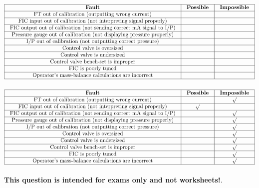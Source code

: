 $$\vbox{\offinterlineskip
\halign{\strut
\vrule \quad\hfil # \ \hfil & 
\vrule \quad\hfil # \ \hfil & 
\vrule \quad\hfil # \ \hfil \vrule \cr
\noalign{\hrule}
%
{\bf Fault} & {\bf Possible} & {\bf Impossible} \cr
%
\noalign{\hrule}
%
FT out of calibration (outputting wrong current) &  &  \cr
%
\noalign{\hrule}
%
FIC input out of calibration (not interpreting signal properly) &  &  \cr
%
\noalign{\hrule}
%
FIC output out of calibration (not sending correct mA signal to I/P) &  &  \cr
%
\noalign{\hrule}
%
Pressure gauge out of calibration (not displaying pressure properly) &  &  \cr
%
\noalign{\hrule}
%
I/P out of calibration (not outputting correct pressure) &  &  \cr
%
\noalign{\hrule}
%
Control valve is oversized &  &  \cr
%
\noalign{\hrule}
%
Control valve is undersized &  &  \cr
%
\noalign{\hrule}
%
Control valve bench-set is improper &  &  \cr
%
\noalign{\hrule}
%
FIC is poorly tuned &  &  \cr
%
\noalign{\hrule}
%
Operator's mass-balance calculations are incorrect &  &  \cr
%
\noalign{\hrule}
} %
}$$ %








$$\vbox{\offinterlineskip
\halign{\strut
\vrule \quad\hfil # \ \hfil & 
\vrule \quad\hfil # \ \hfil & 
\vrule \quad\hfil # \ \hfil \vrule \cr
\noalign{\hrule}
%
{\bf Fault} & {\bf Possible} & {\bf Impossible} \cr
%
\noalign{\hrule}
%
FT out of calibration (outputting wrong current) &  & $\surd$ \cr
%
\noalign{\hrule}
%
FIC input out of calibration (not interpreting signal properly) & $\surd$ &  \cr
%
\noalign{\hrule}
%
FIC output out of calibration (not sending correct mA signal to I/P) &  & $\surd$ \cr
%
\noalign{\hrule}
%
Pressure gauge out of calibration (not displaying pressure properly) &  & $\surd$ \cr
%
\noalign{\hrule}
%
I/P out of calibration (not outputting correct pressure) &  & $\surd$ \cr
%
\noalign{\hrule}
%
Control valve is oversized &  & $\surd$ \cr
%
\noalign{\hrule}
%
Control valve is undersized &  & $\surd$ \cr
%
\noalign{\hrule}
%
Control valve bench-set is improper &  & $\surd$ \cr
%
\noalign{\hrule}
%
FIC is poorly tuned &  & $\surd$ \cr
%
\noalign{\hrule}
%
Operator's mass-balance calculations are incorrect &  & $\surd$ \cr
%
\noalign{\hrule}
} %
}$$ %







{\bf This question is intended for exams only and not worksheets!}.



